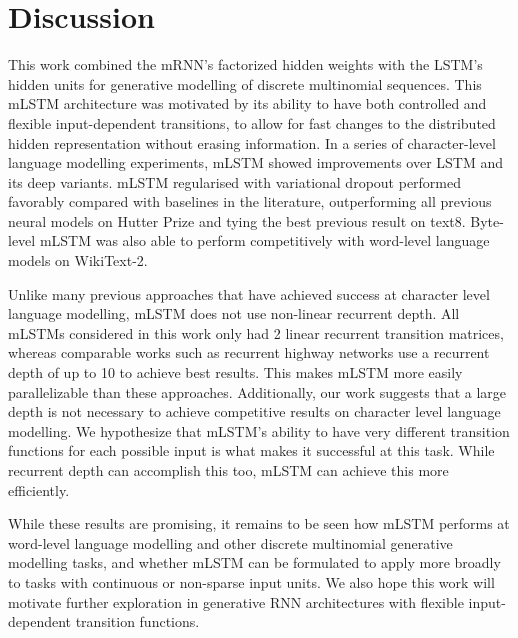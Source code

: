\documentclass{article}
\begin{document}
\section{Discussion}
This work combined the mRNN's factorized hidden weights with the LSTM's hidden units for generative modelling of discrete multinomial sequences. This mLSTM architecture was motivated by its ability to have both controlled and flexible input-dependent transitions, to allow for fast changes to the distributed hidden representation without erasing information. In a series of character-level language modelling experiments, mLSTM showed improvements over LSTM and its deep variants. mLSTM regularised with variational dropout performed favorably compared with baselines in the literature, outperforming all previous neural models on Hutter Prize and tying the best previous result on text8. Byte-level mLSTM was also able to perform competitively with word-level language models on WikiText-2.

Unlike many previous approaches that have achieved success at character level language modelling, mLSTM does not use non-linear recurrent depth. All mLSTMs considered in this work only had 2 linear recurrent transition matrices, whereas comparable works such as recurrent highway networks use a recurrent depth of up to 10 to achieve best results. This makes mLSTM more easily parallelizable than these approaches. Additionally, our work suggests that a large depth is not necessary to achieve competitive results on character level language modelling. We hypothesize that mLSTM's ability to have very different transition functions for each possible input is what makes it successful at this task. While recurrent depth can accomplish this too, mLSTM can achieve this more efficiently.

While these results are promising, it remains to be seen how mLSTM performs at word-level language modelling and other discrete multinomial generative modelling tasks, and whether mLSTM can be formulated to apply more broadly to tasks with continuous or non-sparse input units. We also hope this work will motivate further exploration in generative RNN architectures with flexible input-dependent transition functions.



\end{document}
